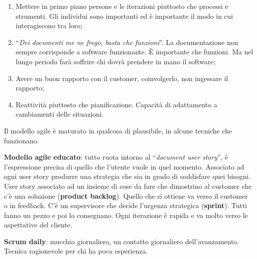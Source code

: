 \begin{enumerate}

	\item Mettere in primo piano persone e le iterazioni piuttosto che processi e strumenti. Gli individui sono importanti ed è importante il modo in cui interagiscono tra loro;
	
	\item ``\textit{Dei documenti me ne frego, basta che funzioni}''. La documentazione non sempre corrisponde a software funzionante. È importante che funzioni. Ma nel lungo periodo farà soffrire chi dovrà prendere in mano il software;
	
	\item Avere un buon rapporto con il customer, coinvolgerlo, non ingessare il rapporto;
	
	\item Reattività piuttosto che pianificazione. Capacità di adattamento a cambiamenti delle situazioni.

\end{enumerate}

Il modello agile è maturato in qualcosa di plausibile, in alcune tecniche che funzionano.

\textbf{Modello agile educato}: tutto ruota intorno al ``\textit{document user story}'', è l'espressione precisa di quello che l'utente vuole in quel momento. Associato ad ogni user story produrre una strategia che sia in grado di soddisfare quei bisogni. User story associato ad un insieme di cose da fare che dimostrino al customer che c'è una soluzione (\textbf{product backlog}). Quello che si ottiene va verso il customer o in feedback. C'è un supervisore che decide l'urgenza strategica (\textbf{sprint}). Tutti fanno un pezzo e poi lo consegnano. Ogni iterazione è rapida e va molto verso le aspettative del cliente.

\textbf{Scrum daily}: mucchio giornaliero, un contatto giornaliero dell'avanzamento. Tecnica ragionevole per chi ha poca esperienza.

